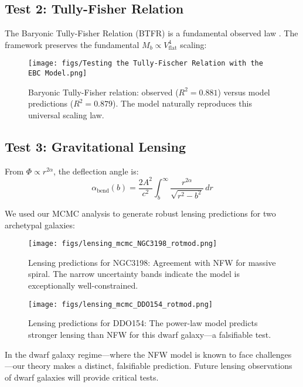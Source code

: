 \documentclass[12pt, a4paper]{article}
\theoremstyle{definition}
\theoremstyle{remark}
\begin{document}
\subsection{Test 2: Tully-Fisher Relation}

The Baryonic Tully-Fisher Relation (BTFR) is a fundamental observed law \cite{Tully1977, McGaugh2000}. The framework preserves the fundamental $M_b \propto V_{\text{flat}}^4$ scaling:

\begin{figure}[H]
    \centering
    \texttt{[image: figs/Testing the Tully-Fischer Relation with the EBC Model.png]}
    \caption{Baryonic Tully-Fisher relation: observed ($R^2 = 0.881$) versus model predictions ($R^2 = 0.879$). The model naturally reproduces this universal scaling law.}
    \label{fig:tfr}
\end{figure}

\subsection{Test 3: Gravitational Lensing}

From $\Phi \propto r^{2\alpha}$, the deflection angle is:
\begin{equation}
\alpha_{\text{bend}}(b) = \frac{2A^2}{c^2}\int_b^\infty \frac{r^{2\alpha}}{\sqrt{r^2-b^2}} \, dr
\end{equation}

We used our MCMC analysis \cite{emcee} to generate robust lensing predictions for two archetypal galaxies:

\begin{figure}[H]
    \centering
    \texttt{[image: figs/lensing\_mcmc\_NGC3198\_rotmod.png]}
    \caption{Lensing predictions for NGC3198: Agreement with NFW for massive spiral. The narrow uncertainty bands indicate the model is exceptionally well-constrained.}
    \label{fig:lensing_ngc3198}
\end{figure}

\begin{figure}[H]
    \centering
    \texttt{[image: figs/lensing\_mcmc\_DDO154\_rotmod.png]}
    \caption{Lensing predictions for DDO154: The power-law model predicts stronger lensing than NFW for this dwarf galaxy—a falsifiable test.}
    \label{fig:lensing_ddo154}
\end{figure}

In the dwarf galaxy regime—where the NFW model is known to face challenges \cite{deBlok2010, Boylan-Kolchin2011}—our theory makes a distinct, falsifiable prediction. Future lensing observations of dwarf galaxies \cite{SLACS, Bellwether} will provide critical tests.
\end{document}
